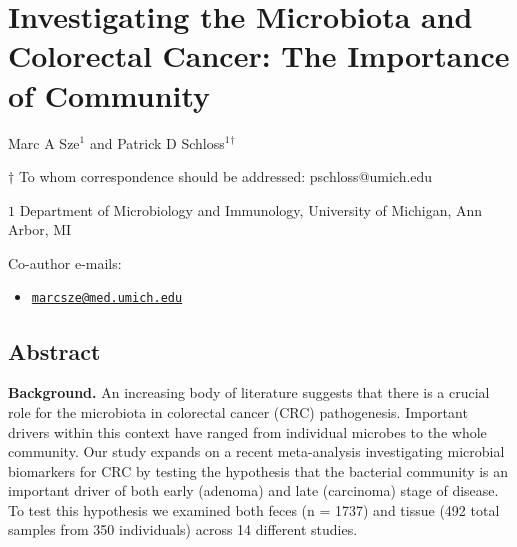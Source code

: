 \documentclass[12pt,]{article}
\title{}
\author{}
\date{}
\providecommand{\tightlist}{%
  \setlength{\itemsep}{0pt}\setlength{\parskip}{0pt}}
\begin{document}
\section{Investigating the Microbiota and Colorectal Cancer: The
Importance of
Community}\label{investigating-the-microbiota-and-colorectal-cancer-the-importance-of-community}

\begin{center}
\vspace{25mm}

Marc A Sze${^1}$ and Patrick D Schloss${^1}$${^\dagger}$

\vspace{20mm}

$\dagger$ To whom correspondence should be addressed: pschloss@umich.edu

$1$ Department of Microbiology and Immunology, University of Michigan, Ann Arbor, MI




\end{center}

Co-author e-mails:

\begin{itemize}
\tightlist
\item
  \href{mailto:marcsze@med.umich.edu}{\nolinkurl{marcsze@med.umich.edu}}
\end{itemize}

\newpage

\linenumbers

\subsection{Abstract}\label{abstract}

\textbf{Background.} An increasing body of literature suggests that
there is a crucial role for the microbiota in colorectal cancer (CRC)
pathogenesis. Important drivers within this context have ranged from
individual microbes to the whole community. Our study expands on a
recent meta-analysis investigating microbial biomarkers for CRC by
testing the hypothesis that the bacterial community is an important
driver of both early (adenoma) and late (carcinoma) stage of disease. To
test this hypothesis we examined both feces (n = 1737) and tissue (492
total samples from 350 individuals) across 14 different studies.
\end{document}
